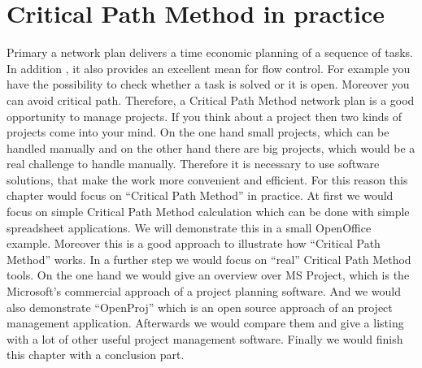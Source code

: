 \section{Critical Path Method in practice}
Primary a network plan delivers a time economic planning of a sequence of tasks. In addition , it also provides an excellent mean for flow control. For example you have the possibility to check whether a task is solved or it is open. Moreover you can avoid critical path. Therefore, a Critical Path Method network plan is a good opportunity to manage projects. If you think about a project then two kinds of projects come into your mind. On the one hand small projects, which can be handled manually and on the other hand there are big projects, which would be a real challenge to handle manually. Therefore it is necessary to use software solutions, that make the work more convenient and efficient. 
For this reason this chapter would focus on “Critical Path Method” in practice. At first we would focus on simple Critical Path Method calculation which can be done with simple spreadsheet applications. We will demonstrate this in a small OpenOffice example. Moreover this is a good approach to illustrate how “Critical Path Method” works.
In a further step we would focus on “real” Critical Path Method tools. On the one hand we would give an overview over MS Project, which is the Microsoft's commercial approach of a project planning software. And we would also demonstrate “OpenProj” which is an open source approach of an project management application. Afterwards we would compare them and give a listing with a lot of other useful project management software. 
Finally we would finish this chapter with a conclusion part.

